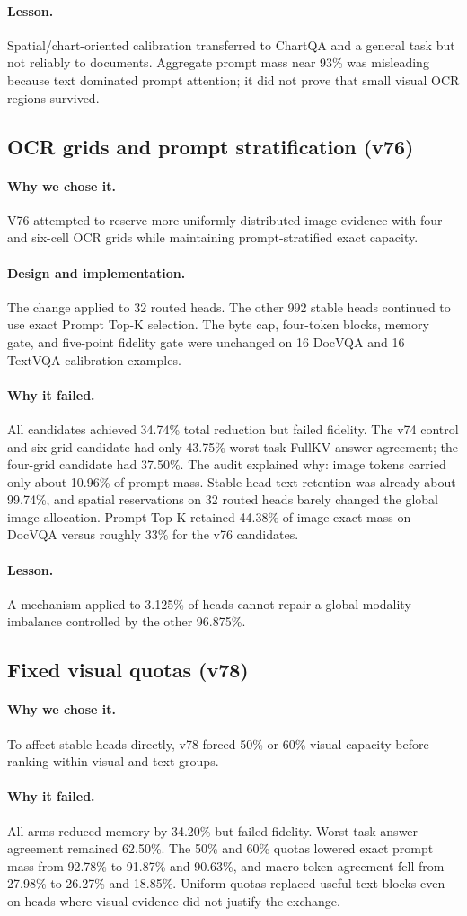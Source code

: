\documentclass[11pt]{article}
\newcommand{\lesson}{\paragraph{Lesson.}}
\newcommand{\reason}{\paragraph{Why we chose it.}}
\newcommand{\design}{\paragraph{Design and implementation.}}
\newcommand{\failure}{\paragraph{Why it failed.}}
\begin{document}
\lesson
Spatial/chart-oriented calibration transferred to ChartQA and a general task but not reliably to
documents.  Aggregate prompt mass near 93\% was misleading because text dominated prompt
attention; it did not prove that small visual OCR regions survived.

\subsection{OCR grids and prompt stratification (v76)}

\reason
V76 attempted to reserve more uniformly distributed image evidence with four- and six-cell OCR
grids while maintaining prompt-stratified exact capacity.

\design
The change applied to 32 routed heads.  The other 992 stable heads continued to use exact Prompt
Top-K selection.  The byte cap, four-token blocks, memory gate, and five-point fidelity gate were
unchanged on 16 DocVQA and 16 TextVQA calibration examples.

\failure
All candidates achieved 34.74\% total reduction but failed fidelity.  The v74 control and six-grid
candidate had only 43.75\% worst-task FullKV answer agreement; the four-grid candidate had 37.50\%.
The audit explained why: image tokens carried only about 10.96\% of prompt mass.  Stable-head text
retention was already about 99.74\%, and spatial reservations on 32 routed heads barely changed
the global image allocation.  Prompt Top-K retained 44.38\% of image exact mass on DocVQA versus
roughly 33\% for the v76 candidates.

\lesson
A mechanism applied to 3.125\% of heads cannot repair a global modality imbalance controlled by
the other 96.875\%.

\subsection{Fixed visual quotas (v78)}

\reason
To affect stable heads directly, v78 forced 50\% or 60\% visual capacity before ranking within
visual and text groups.

\failure
All arms reduced memory by 34.20\% but failed fidelity.  Worst-task answer agreement remained
62.50\%.  The 50\% and 60\% quotas lowered exact prompt mass from 92.78\% to 91.87\% and 90.63\%,
and macro token agreement fell from 27.98\% to 26.27\% and 18.85\%.  Uniform quotas replaced useful
text blocks even on heads where visual evidence did not justify the exchange.
\end{document}
